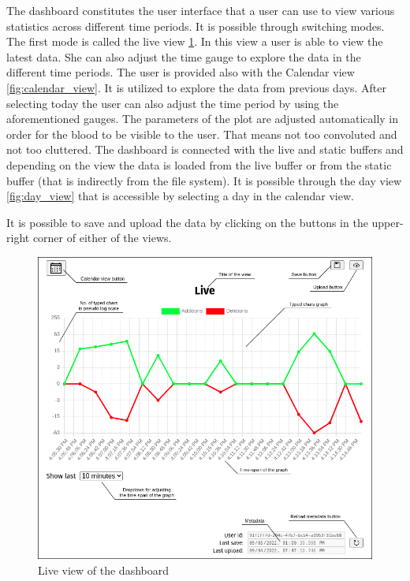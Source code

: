The dashboard constitutes the user interface that a user can use to view various statistics across different time periods. It is possible through switching modes. The first mode is called the live view \ref{fig:live_view}. In this view a user is able to view the latest data. She can also adjust the time gauge to explore the data in the different time periods.
The user is provided also with the Calendar view \ref{fig:calendar_view}. It is utilized to explore the data from previous days. After selecting today the user can also adjust the time period by using the aforementioned gauges. The parameters of the plot are adjusted automatically in order for the blood to be visible to the user. That means not too convoluted and not too cluttered. The dashboard is connected with the live and static buffers and depending on the view the data is loaded from the live buffer or from the static buffer (that is indirectly from the file system). It is possible through the day view \ref{fig:day_view} that is accessible by selecting a day in the calendar view.

It is possible to save and upload the data by clicking on the buttons in the upper-right corner of either of the views.

\begin{figure}[htbp]
  \centering
  \includegraphics[scale=0.4]{chapters/methodology/graphics/live-view.png}
  \caption{Live view of the dashboard}
  \label{fig:live_view}
\end{figure}

